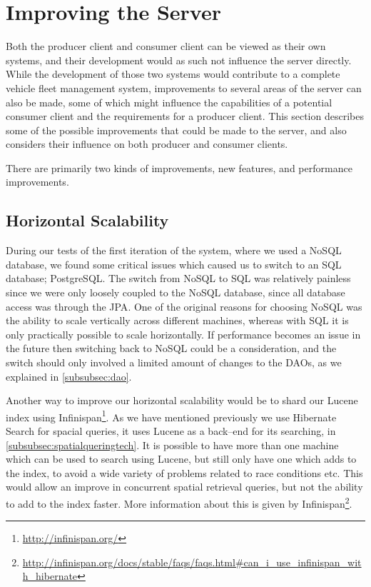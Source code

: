 \section{Improving the Server}\label{sec:fw_server}
Both the producer client and consumer client can be viewed as their own systems, and their development would as such not influence the server directly.
While the development of those two systems would contribute to a complete vehicle fleet management system, improvements to several areas of the server can also be made, some of which might influence the capabilities of a potential consumer client and the requirements for a producer client.
This section describes some of the possible improvements that could be made to the server, and also considers their influence on both producer and consumer clients.

There are primarily two kinds of improvements, new features, and performance improvements. 
\subsection{Horizontal Scalability}
During our tests of the first iteration of the system, where we used a NoSQL database, we found some critical issues which caused us to switch to an SQL database; PostgreSQL.
The switch from NoSQL to SQL was relatively painless since we were only loosely coupled to the NoSQL database, since all database access was through the \ac{JPA}.
One of the original reasons for choosing NoSQL was the ability to scale vertically across different machines, whereas with SQL it is only practically possible to scale horizontally.
If performance becomes an issue in the future then switching back to NoSQL could be a consideration, and the switch should only involved a limited amount of changes to the \acp{DAO}, as we explained in \cref{subsubsec:dao}.

Another way to improve our horizontal scalability would be to shard our Lucene index using Infinispan\footnote{\url{http://infinispan.org/}}.
As we have mentioned previously we use Hibernate Search for spacial queries, it uses Lucene as a back--end for its searching, in \cref{subsubsec:spatialqueringtech}.
It is possible to have more than one machine which can be used to search using Lucene, but still only have one which adds to the index, to avoid a wide variety of problems related to race conditions etc.
This would allow an improve in concurrent spatial retrieval queries, but not the ability to add to the index faster.
More information about this is given by Infinispan\footnote{\url{http://infinispan.org/docs/stable/faqs/faqs.html\#can_i_use_infinispan_with_hibernate}}.

